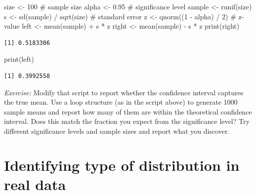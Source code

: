 \documentclass[
  letterpaper,
  DIV=11,
  numbers=noendperiod]{scrreprt}
\newenvironment{Shaded}{\begin{snugshade}}{\end{snugshade}}
\newcommand{\CommentTok}[1]{\textcolor[rgb]{0.37,0.37,0.37}{#1}}
\newcommand{\DecValTok}[1]{\textcolor[rgb]{0.68,0.00,0.00}{#1}}
\newcommand{\FloatTok}[1]{\textcolor[rgb]{0.68,0.00,0.00}{#1}}
\newcommand{\FunctionTok}[1]{\textcolor[rgb]{0.28,0.35,0.67}{#1}}
\newcommand{\NormalTok}[1]{\textcolor[rgb]{0.00,0.23,0.31}{#1}}
\newcommand{\OtherTok}[1]{\textcolor[rgb]{0.00,0.23,0.31}{#1}}
\newcommand{\SpecialCharTok}[1]{\textcolor[rgb]{0.37,0.37,0.37}{#1}}
\begin{document}
\begin{Shaded}
\begin{Highlighting}[]
\NormalTok{size }\OtherTok{\textless{}{-}} \DecValTok{100} \CommentTok{\# sample size}
\NormalTok{alpha }\OtherTok{\textless{}{-}} \FloatTok{0.95} \CommentTok{\# significance level}
\NormalTok{sample }\OtherTok{\textless{}{-}} \FunctionTok{runif}\NormalTok{(size)}
\NormalTok{s }\OtherTok{\textless{}{-}} \FunctionTok{sd}\NormalTok{(sample) }\SpecialCharTok{/} \FunctionTok{sqrt}\NormalTok{(size) }\CommentTok{\# standard error}
\NormalTok{z }\OtherTok{\textless{}{-}} \FunctionTok{qnorm}\NormalTok{((}\DecValTok{1} \SpecialCharTok{{-}}\NormalTok{ alpha) }\SpecialCharTok{/} \DecValTok{2}\NormalTok{) }\CommentTok{\# z{-}value}
\NormalTok{left }\OtherTok{\textless{}{-}} \FunctionTok{mean}\NormalTok{(sample) }\SpecialCharTok{+}\NormalTok{ s }\SpecialCharTok{*}\NormalTok{ z}
\NormalTok{right }\OtherTok{\textless{}{-}} \FunctionTok{mean}\NormalTok{(sample) }\SpecialCharTok{{-}}\NormalTok{ s }\SpecialCharTok{*}\NormalTok{ z}
\FunctionTok{print}\NormalTok{(right)}
\end{Highlighting}
\end{Shaded}

\begin{verbatim}
[1] 0.5183306
\end{verbatim}

\begin{Shaded}
\begin{Highlighting}[]
\FunctionTok{print}\NormalTok{(left)}
\end{Highlighting}
\end{Shaded}

\begin{verbatim}
[1] 0.3992558
\end{verbatim}

\emph{Exercise:} Modify that script to report whether the confidence
interval captures the true mean. Use a loop structure (as in the script
above) to generate 1000 sample means and report how many of them are
within the theoretical confidence interval. Does this match the fraction
you expect from the significance level? Try different significance
levels and sample sizes and report what you discover.

\hypertarget{identifying-type-of-distribution-in-real-data}{%
\section{Identifying type of distribution in real
data}\label{identifying-type-of-distribution-in-real-data}}
\end{document}
